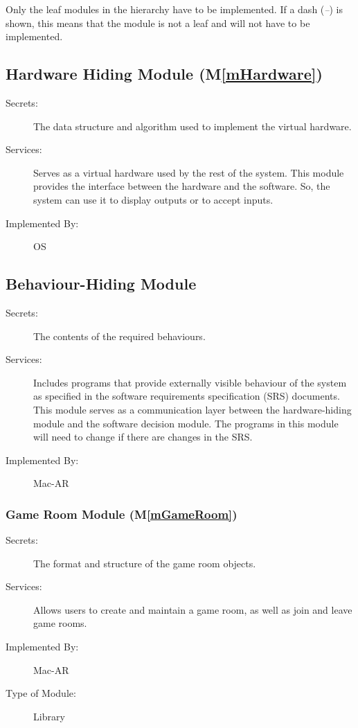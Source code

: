 \documentclass[12pt, titlepage]{article}
\newcommand{\mref}[1]{M\ref{#1}}
\begin{document}
Only the leaf modules in the hierarchy have to be implemented. If a dash
(\emph{--}) is shown, this means that the module is not a leaf and will not have
to be implemented.

\subsection{Hardware Hiding Module (\mref{mHardware})}

\begin{description}
\item[Secrets:]The data structure and algorithm used to implement the virtual
  hardware.
\item[Services:]Serves as a virtual hardware used by the rest of the
  system. This module provides the interface between the hardware and the
  software. So, the system can use it to display outputs or to accept inputs.
\item[Implemented By:] OS
\end{description}

\subsection{Behaviour-Hiding Module}

\begin{description}
\item[Secrets:]The contents of the required behaviours.
\item[Services:]Includes programs that provide externally visible behaviour of
  the system as specified in the software requirements specification (SRS)
  documents. This module serves as a communication layer between the
  hardware-hiding module and the software decision module. The programs in this
  module will need to change if there are changes in the SRS.
\item[Implemented By:] Mac-AR
\end{description}

\subsubsection{Game Room Module (\mref{mGameRoom})}

\begin{description}
\item[Secrets:]The format and structure of the game room objects.
\item[Services:] Allows users to create and maintain a game room, as well as join and leave game rooms. 
\item[Implemented By:] Mac-AR
\item[Type of Module:] Library
\end{description}
\end{document}
